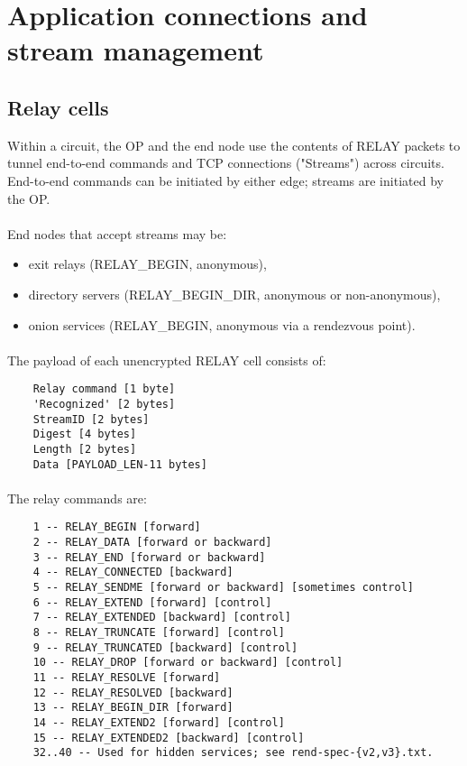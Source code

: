 \section{Application connections and stream management}

\subsection{Relay cells}

Within a circuit, the OP and the end node use the contents of
RELAY packets to tunnel end-to-end commands and TCP connections
("Streams") across circuits. End-to-end commands can be initiated
by either edge; streams are initiated by the OP.

\paragraph{}
End nodes that accept streams may be:
\begin{itemize}
    \item exit relays (RELAY_BEGIN, anonymous),
    \item directory servers (RELAY_BEGIN_DIR, anonymous or non-anonymous),
    \item onion services (RELAY_BEGIN, anonymous via a rendezvous point).
\end{itemize}

\paragraph{}
The payload of each unencrypted RELAY cell consists of:

\begin{verbatim}
    Relay command [1 byte]
    'Recognized' [2 bytes]
    StreamID [2 bytes]
    Digest [4 bytes]
    Length [2 bytes]
    Data [PAYLOAD_LEN-11 bytes]
\end{verbatim}

\paragraph{}
The relay commands are:

\begin{verbatim}
    1 -- RELAY_BEGIN [forward]
    2 -- RELAY_DATA [forward or backward]
    3 -- RELAY_END [forward or backward]
    4 -- RELAY_CONNECTED [backward]
    5 -- RELAY_SENDME [forward or backward] [sometimes control]
    6 -- RELAY_EXTEND [forward] [control]
    7 -- RELAY_EXTENDED [backward] [control]
    8 -- RELAY_TRUNCATE [forward] [control]
    9 -- RELAY_TRUNCATED [backward] [control]
    10 -- RELAY_DROP [forward or backward] [control]
    11 -- RELAY_RESOLVE [forward]
    12 -- RELAY_RESOLVED [backward]
    13 -- RELAY_BEGIN_DIR [forward]
    14 -- RELAY_EXTEND2 [forward] [control]
    15 -- RELAY_EXTENDED2 [backward] [control]
    32..40 -- Used for hidden services; see rend-spec-{v2,v3}.txt.
\end{verbatim}

